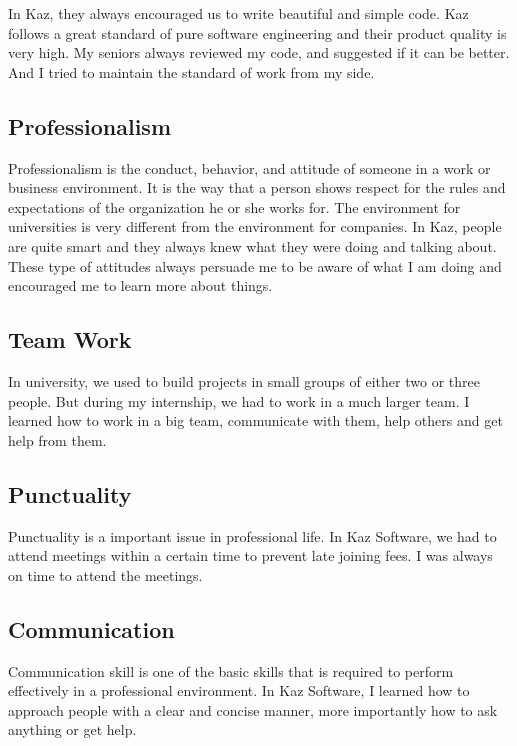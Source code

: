In Kaz, they always encouraged us to write beautiful and simple code.
Kaz follows a great standard of pure software engineering and their product quality is very high.
My seniors always reviewed my code, and suggested if it can be better.
And I tried to maintain the standard of work from my side.

\subsection{Professionalism}

Professionalism is the conduct, behavior, and attitude of someone in a work or business environment.
It is the way that a person shows respect for the rules and expectations of the organization he or she works for.
The environment for universities is very different from the environment for companies.
In Kaz, people are quite smart and they always knew what they were doing and talking about.
These type of attitudes always persuade me to be aware of what I am doing and encouraged me to learn  more about things.

\subsection{Team Work}

In university, we used to build projects in small groups of either two or three people.
But during my internship, we had to work in a much larger team.
I learned how to work in a big team, communicate with them, help others and get help from them.

\subsection{Punctuality}

Punctuality is a important issue in professional life.
In Kaz Software, we had to attend meetings within a certain time to prevent late joining fees.
I was always on time to attend the meetings.

\subsection{Communication}

Communication skill is one of the basic skills that is required to perform effectively in a professional environment.
In Kaz Software, I learned how to approach people with a clear and concise manner, more importantly how to ask anything or get help.


